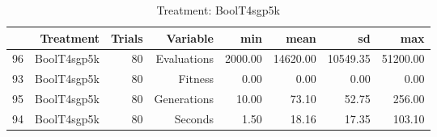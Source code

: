 \begin{table}[ht]
\centering
\begin{tabular}{rrrrrrrr}
  \hline
 & Treatment & Trials & Variable & min & mean & sd & max \\ 
  \hline
96 & BoolT4sgp5k &  80 & Evaluations & 2000.00 & 14620.00 & 10549.35 & 51200.00 \\ 
  93 & BoolT4sgp5k &  80 & Fitness & 0.00 & 0.00 & 0.00 & 0.00 \\ 
  95 & BoolT4sgp5k &  80 & Generations & 10.00 & 73.10 & 52.75 & 256.00 \\ 
  94 & BoolT4sgp5k &  80 & Seconds & 1.50 & 18.16 & 17.35 & 103.10 \\ 
   \hline
\end{tabular}
\caption{Treatment: BoolT4sgp5k} 
\end{table}
